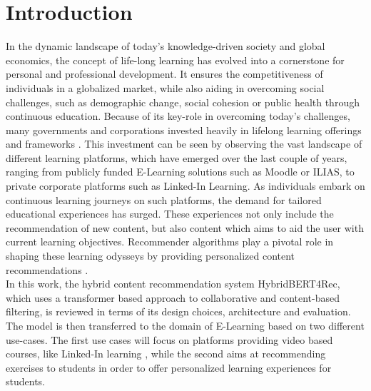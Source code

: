 \documentclass{Academic}
\begin{document}
    \myabstract{}
    \renewcommand{\myTitle}{Hybrid Recommender Models in E-Learning: A Comprehensive Review of HybridBERT4Rec}
    \renewcommand{\MyAuthor}{Leon Knorr}
    \renewcommand{\MyDepartment}{Mannheim Master of Datascience}
    \renewcommand{\ID}{1902854}
    \renewcommand{\Keywords}{Education, AI, E-Learning}
    \maketitle

    \section{Introduction}
    In the dynamic landscape of today's knowledge-driven society and global economics, the concept of life-long learning has evolved into a cornerstone for personal and professional development. It ensures the competitiveness of individuals in a globalized market, while also aiding in overcoming social challenges, such as demographic change, social cohesion or public health through continuous education. Because of its key-role in overcoming today's challenges, many governments and corporations invested heavily in lifelong learning offerings and frameworks \cite{rubensonAdultLearningEducation2011}. This investment can be seen by observing the vast landscape of different learning platforms, which have emerged over the last couple of years, ranging from publicly funded E-Learning solutions such as Moodle\cite{StartseiteMoodleOrg} or ILIAS\cite{Ilias}, to private corporate platforms such as Linked-In Learning\cite{LinkedInLearningMit}. As individuals embark on continuous learning journeys on such platforms, the demand for tailored educational experiences has surged. These experiences not only include the recommendation of new content, but also content which aims to aid the user with current learning objectives. Recommender algorithms play a pivotal role in shaping these learning odysseys by providing personalized content recommendations \cite{jeevamolOntologybasedHybridElearning2021}. \\
    In this work, the hybrid content recommendation system HybridBERT4Rec, which uses a transformer based approach to collaborative and content-based filtering, is reviewed in terms of its design choices, architecture and evaluation. The model is then transferred to the domain of E-Learning based on two different use-cases. The first use cases will focus on platforms providing video based courses, like Linked-In learning \cite{LinkedInLearningMit}, while the second aims at recommending exercises to students in order to offer personalized learning experiences for students.
\end{document}
